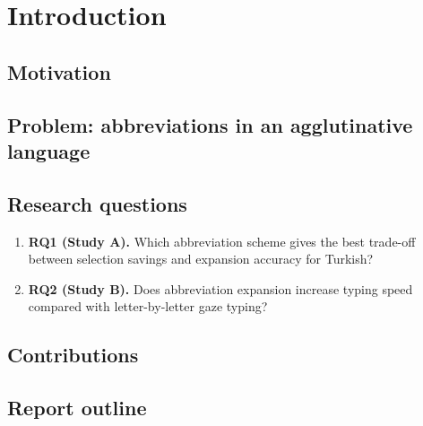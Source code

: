 \chapter{Introduction}
\label{ch:introduction}

\section{Motivation}

\section{Problem: abbreviations in an agglutinative language}

\section{Research questions}
\begin{enumerate}
  \item \textbf{RQ1 (Study A).} Which abbreviation scheme gives the best trade-off between
        selection savings and expansion accuracy for Turkish?
  \item \textbf{RQ2 (Study B).} Does abbreviation expansion increase typing speed compared with
        letter-by-letter gaze typing?
\end{enumerate}

\section{Contributions}

\section{Report outline}
